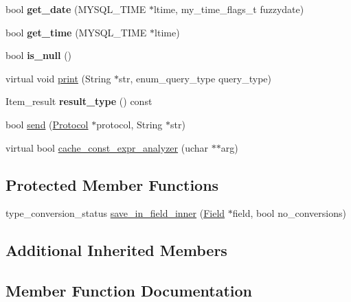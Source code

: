 \begin{DoxyCompactItemize}
bool {\bfseries get\+\_\+date} (M\+Y\+S\+Q\+L\+\_\+\+T\+I\+ME $\ast$ltime, my\+\_\+time\+\_\+flags\+\_\+t fuzzydate)
\item 
\mbox{\label{classItem__name__const_a5ffc4ae7f7166adae9a15ee5e2ab57b5}} 
bool {\bfseries get\+\_\+time} (M\+Y\+S\+Q\+L\+\_\+\+T\+I\+ME $\ast$ltime)
\item 
\mbox{\label{classItem__name__const_a7e285f8bda7702e9b07dd43df0a4f2b2}} 
bool {\bfseries is\+\_\+null} ()
\item 
virtual void \mbox{\hyperlink{classItem__name__const_ade0f7d82ec667f6bda7d59aef50bf17d}{print}} (String $\ast$str, enum\+\_\+query\+\_\+type query\+\_\+type)
\item 
\mbox{\label{classItem__name__const_a228f01c1d0a1085ea0945863bd330897}} 
Item\+\_\+result {\bfseries result\+\_\+type} () const
\item 
bool \mbox{\hyperlink{classItem__name__const_a11b5077653b428797e7f9ca7e5237eec}{send}} (\mbox{\hyperlink{classProtocol}{Protocol}} $\ast$protocol, String $\ast$str)
\item 
virtual bool \mbox{\hyperlink{classItem__name__const_aa6f5f451a1c2fc81670502605ae1cffc}{cache\+\_\+const\+\_\+expr\+\_\+analyzer}} (uchar $\ast$$\ast$arg)
\end{DoxyCompactItemize}
\subsection*{Protected Member Functions}
\begin{DoxyCompactItemize}
\item 
type\+\_\+conversion\+\_\+status \mbox{\hyperlink{classItem__name__const_a5008a91f531840dd4b0595a0e3923263}{save\+\_\+in\+\_\+field\+\_\+inner}} (\mbox{\hyperlink{classField}{Field}} $\ast$field, bool no\+\_\+conversions)
\end{DoxyCompactItemize}
\subsection*{Additional Inherited Members}


\subsection{Member Function Documentation}
\mbox{\label{classItem__name__const_aa6f5f451a1c2fc81670502605ae1cffc}} 
